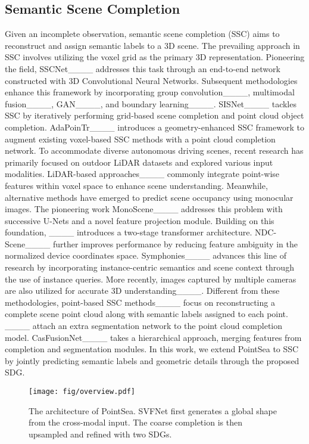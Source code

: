 \subsection{Semantic Scene Completion}
Given an incomplete observation, semantic scene completion (SSC) aims to reconstruct and assign semantic labels to a 3D scene.
The prevailing approach in SSC involves utilizing the voxel grid as the primary 3D representation. Pioneering the field, SSCNet____ addresses this task through an end-to-end network constructed with 3D Convolutional Neural Networks. Subsequent methodologies enhance this framework by incorporating group convolution____, multimodal fusion____, GAN____, and boundary learning____. 
SISNet____ tackles SSC by iteratively performing grid-based scene completion and point cloud object completion.
AdaPoinTr____ introduces a geometry-enhanced SSC framework to augment existing voxel-based SSC methods with a point cloud completion network.
% 
To accommodate diverse autonomous driving scenes, recent research has primarily focused on outdoor LiDAR datasets and explored various input modalities.
LiDAR-based approaches____ commonly integrate point-wise features within voxel space to enhance scene understanding. Meanwhile, alternative methods have emerged to predict scene occupancy using monocular images. The pioneering work MonoScene____ addresses this problem with successive U-Nets and a novel feature projection module. Building on this foundation, ____ introduces a two-stage transformer architecture. 
NDC-Scene____ further improves performance by reducing feature ambiguity in the normalized device coordinates space. Symphonies____ advances this line of research by incorporating instance-centric semantics and scene context through the use of instance queries.
More recently, images captured by multiple cameras are also utilized for accurate 3D understanding____.
% 
Different from these methodologies, point-based SSC methods____ focus on reconstructing a complete scene point cloud along with semantic labels assigned to each point.
____ attach an extra segmentation network to the point cloud completion model.
CasFusionNet____ takes a hierarchical approach, merging features from completion and segmentation modules.
In this work, we extend PointSea to SSC by jointly predicting semantic labels and geometric details through the proposed SDG.

\begin{figure*}[h]
  \centering
  \texttt{[image: fig/overview.pdf]}
\caption{The architecture of PointSea. SVFNet first generates a global shape from the cross-modal input. The coarse completion is then upsampled and refined with two SDGs.}
  \label{fig:overview}
\end{figure*}